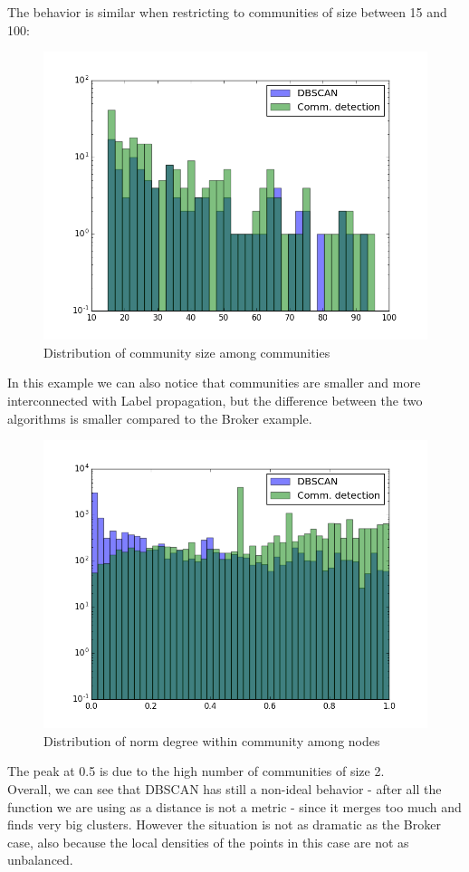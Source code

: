 \documentclass[a4paper,11pt]{book}
\begin{document}
The behavior is similar when restricting to communities of size between 15 and 100:
\begin{figure}[H]
\centering
\includegraphics[height=7.25 cm,width=10 cm]{plot_nnodes_ccred_1y.png}
\caption{Distribution of community size among communities}
\end{figure}
 In this example we can also notice that communities are smaller and more interconnected with Label propagation, but the difference between the two algorithms is smaller compared to the Broker example.
  \begin{figure}[H]
\centering
\includegraphics[height=7.25 cm,width=10 cm]{plot_net_ndegree_ccred_1y.png}
\caption{Distribution of norm degree within community among nodes}
\end{figure}
The peak at 0.5 is due to the high number of communities of size 2.\\
Overall, we can see that DBSCAN has still a non-ideal behavior - after all the function we are using as a distance is not a metric - since it merges too much and finds very big clusters. However the situation is not as dramatic as the Broker case, also because the local densities of the points in this case are not as unbalanced.\\
\end{document}
